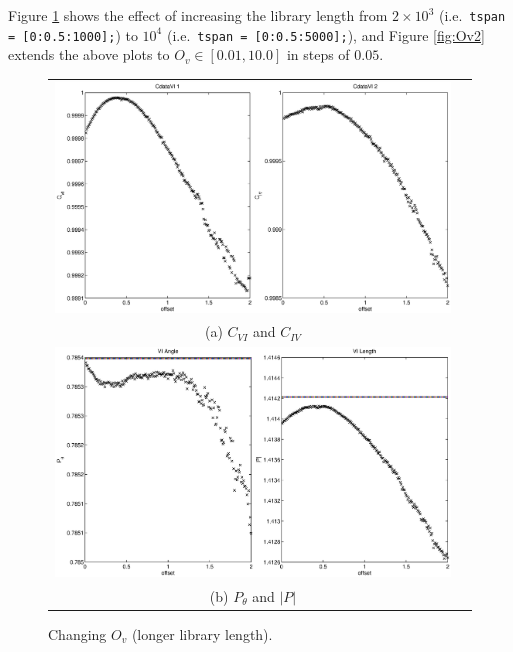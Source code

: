 \documentclass{article}
\begin{document}
Figure \ref{fig:Ov1} shows the effect of increasing the library length from $2\times10^3$ (i.e.\ {\tt tspan = [0:0.5:1000];}) to $10^4$ (i.e.\ {\tt tspan = [0:0.5:5000];}), and Figure \ref{fig:Ov2} extends the above plots to $O_v\in[0.01,10.0]$ in steps of $0.05$.
\begin{figure}[H]
\begin{tabular}{cc}
\includegraphics[scale=0.5]{RLcirc_varyV_offsetLup2.eps} \\
(a) $C_{VI}$ and $C_{IV}$ \\[6pt]
\includegraphics[scale=0.5]{RLcirc_varyV_offsetLup.eps} \\
(b) $P_\theta$ and $|P|$ \\[6pt]
\end{tabular}
\caption{Changing $O_v$ (longer library length).}
\label{fig:Ov1}
\end{figure}
\end{document}
